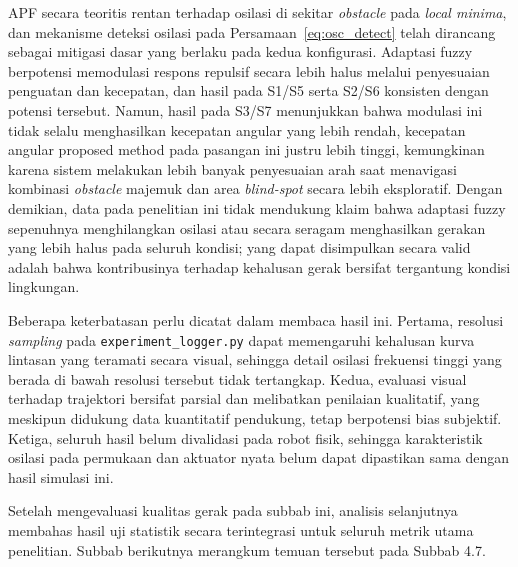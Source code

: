 APF secara teoritis rentan terhadap osilasi di sekitar \textit{obstacle}
pada \textit{local minima}, dan mekanisme deteksi osilasi pada
Persamaan~\ref{eq:osc_detect} telah dirancang sebagai mitigasi dasar yang
berlaku pada kedua konfigurasi. Adaptasi fuzzy berpotensi memodulasi
respons repulsif secara lebih halus melalui penyesuaian penguatan dan
kecepatan, dan hasil pada S1/S5 serta S2/S6 konsisten dengan potensi
tersebut. Namun, hasil pada S3/S7 menunjukkan bahwa modulasi ini tidak
selalu menghasilkan kecepatan angular yang lebih rendah, kecepatan angular
proposed method pada pasangan ini justru lebih tinggi, kemungkinan karena
sistem melakukan lebih banyak penyesuaian arah saat menavigasi kombinasi
\textit{obstacle} majemuk dan area \textit{blind-spot} secara lebih
eksploratif. Dengan demikian, data pada penelitian ini tidak mendukung
klaim bahwa adaptasi fuzzy sepenuhnya menghilangkan osilasi atau secara
seragam menghasilkan gerakan yang lebih halus pada seluruh kondisi; yang
dapat disimpulkan secara valid adalah bahwa kontribusinya terhadap
kehalusan gerak bersifat tergantung kondisi lingkungan.

Beberapa keterbatasan perlu dicatat dalam membaca hasil ini. Pertama,
resolusi \textit{sampling} pada \texttt{experiment\_logger.py} dapat
memengaruhi kehalusan kurva lintasan yang teramati secara visual, sehingga
detail osilasi frekuensi tinggi yang berada di bawah resolusi tersebut
tidak tertangkap. Kedua, evaluasi visual terhadap trajektori bersifat
parsial dan melibatkan penilaian kualitatif, yang meskipun didukung data
kuantitatif pendukung, tetap berpotensi bias subjektif. Ketiga, seluruh
hasil belum divalidasi pada robot fisik, sehingga karakteristik osilasi
pada permukaan dan aktuator nyata belum dapat dipastikan sama dengan hasil
simulasi ini.

Setelah mengevaluasi kualitas gerak pada subbab ini, analisis selanjutnya
membahas hasil uji statistik secara terintegrasi untuk seluruh metrik utama
penelitian. Subbab berikutnya merangkum temuan tersebut pada Subbab 4.7.